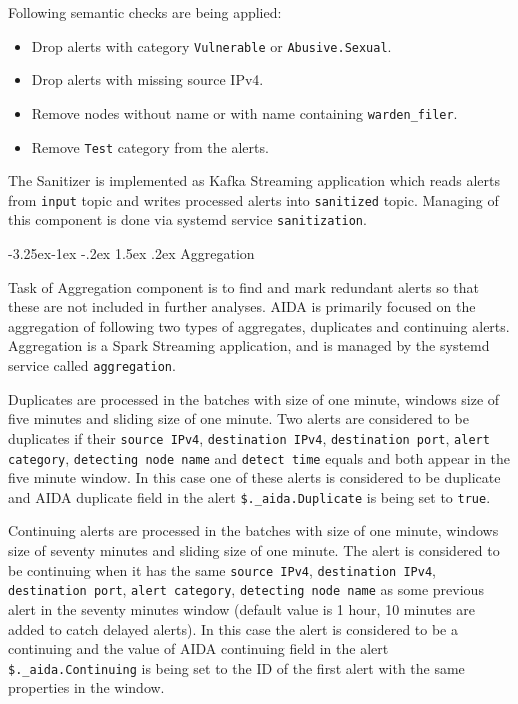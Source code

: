 \documentclass[a4paper]{article} %
\makeatletter
\renewcommand{\normalsize}{\fontsize{12}{15}\selectfont\color{textcolor}}
\renewcommand\subsection{\@startsection{subsection}{2}{\z@}%
                   {-3.25ex\@plus -1ex \@minus -.2ex}%
                   {1.5ex \@plus .2ex}%
                   {\normalfont\sffamily\large\bfseries\color{projectcolor}}}
\renewcommand\subsubsection{\@startsection{subsubsection}{3}{\z@}%
                   {-3.25ex\@plus -1ex \@minus -.2ex}%
                   {1.5ex \@plus .2ex}%
                   {\normalfont\sffamily\normalsize\bfseries\color{projectcolor}}}
\makeatother
\begin{document}
Following semantic checks are being applied:
\begin{itemize}[noitemsep,nolistsep]
\item Drop alerts with category \texttt{Vulnerable} or \texttt{Abusive.Sexual}.
\item Drop alerts with missing source IPv4.
\item Remove nodes without name or with name containing \texttt{warden\_filer}.
\item Remove \texttt{Test} category from the alerts.
\end{itemize}
The Sanitizer is implemented as Kafka Streaming application which reads alerts from \texttt{input} topic and writes processed alerts into \texttt{sanitized} topic. Managing of this component is done via systemd service \texttt{sanitization}.

\subsection{Aggregation}

Task of Aggregation component is to find and mark redundant alerts so that these are not included in further analyses. AIDA is primarily focused on the aggregation of following two types of aggregates, duplicates and continuing alerts. Aggregation is a Spark Streaming application, and is managed by the systemd service called \texttt{aggregation}.


Duplicates are processed in the batches with size of one minute, windows size of five minutes and sliding size of one minute. 
Two alerts are considered to be duplicates if their \texttt{source IPv4}, \texttt{destination IPv4}, \texttt{destination port}, \texttt{alert category}, \texttt{detecting node name} and \texttt{detect time} equals and both appear in the five minute window. In this case one of these alerts is considered to be duplicate and AIDA duplicate field in the alert \texttt{\$.\_aida.Duplicate} is being set to \texttt{true}.


Continuing alerts are processed in the batches with size of one minute, windows size of seventy minutes and sliding size of one minute. 
The alert is considered to be continuing when it has the same \texttt{source IPv4}, \texttt{destination IPv4}, \texttt{destination port}, \texttt{alert category}, \texttt{detecting node name} as some previous alert in the seventy minutes window (default value is 1 hour, 10 minutes are added to catch delayed alerts). In this case the alert is considered to be a continuing and the value of AIDA continuing field in the alert \texttt{\$.\_aida.Continuing} is being set to the ID of the first alert with the same properties in the window.
\end{document}
